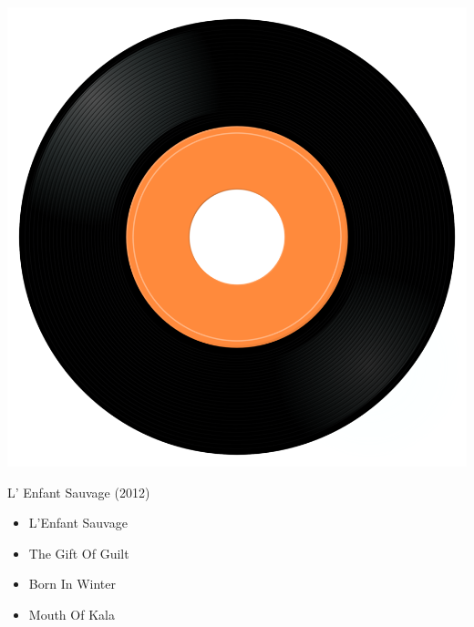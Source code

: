 \begin{minipage}[t]{0.25\textwidth}\vspace{0pt}
\captionsetup{type=figure}
\includegraphics[width=\textwidth]{Images/cover.png}
\caption*{L' Enfant Sauvage (2012)}
\end{minipage}
\begin{minipage}[t]{0.25\textwidth}\vspace{0pt}
\begin{itemize}[nosep,leftmargin=1em,labelwidth=*,align=left]
	\setlength{\itemsep}{0pt}
	\item L'Enfant Sauvage
	\item The Gift Of Guilt
	\item Born In Winter
	\item Mouth Of Kala
\end{itemize}
\end{minipage}

